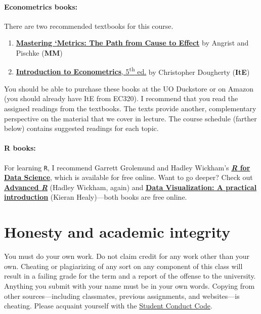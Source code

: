\documentclass[10pt]{article}
\begin{document}
\paragraph{Econometrics books:} There are two recommended textbooks for this course.

\begin{enumerate}
  \item \href{https://www.amazon.com/Mastering-Metrics-Path-Cause-Effect/dp/0691152845/}{\textbf{Mastering `Metrics: The Path from Cause to Effect}} by Angrist and Pischke (\textbf{MM})
  \item \href{http://smile.amazon.com/Introduction-Econometrics-Christopher-Dougherty/dp/0199676828/}{\textbf{Introduction to Econometrics}, 5\textsuperscript{th} ed.} by Christopher Dougherty (\textbf{ItE})
\end{enumerate}
You should be able to purchase these books at the UO Duckstore or on Amazon (you should already have ItE from EC320). I recommend that you read the assigned readings from the textbooks. The texts provide another, complementary perspective on the material that we cover in lecture. The course schedule (farther below) contains suggested readings for each topic.

\paragraph{R books:} For learning \texttt{R}, I recommend Garrett Grolemund and Hadley Wickham's \href{http://r4ds.had.co.nz}{\textbf{\textit{R} for Data Science}}, which is available for free online. Want to go deeper? Check out \href{http://adv-r.had.co.nz/}{\textbf{Advanced \textit{R}}} (Hadley Wickham, again) and \href{http://socviz.co/}{\textbf{Data Visualization: A practical introduction}} (Kieran Healy)---both books are free online.

\section*{Honesty and academic integrity}

You must do your own work. Do not claim credit for any work other than your own. Cheating or plagiarizing of any sort on any component of this class will result in a failing grade for the term and a report of the offense to the university. Anything you submit with your name must be in your own words. Copying from other sources---including classmates, previous assignments, and websites---is cheating. Please acquaint yourself with the \href{http://studentlife.uoregon.edu}{Student Conduct Code}.
\end{document}
